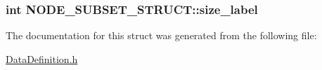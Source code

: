 \hypertarget{structNODE__SUBSET__STRUCT_ab2b2587d1db1672a8dcf6e7050b30f82}{
\subsubsection[{size\-\_\-label}]{\setlength{\rightskip}{0pt plus 5cm}int N\-O\-D\-E\-\_\-\-S\-U\-B\-S\-E\-T\-\_\-\-S\-T\-R\-U\-C\-T\-::size\-\_\-label}}\label{structNODE__SUBSET__STRUCT_ab2b2587d1db1672a8dcf6e7050b30f82}


The documentation for this struct was generated from the following file\-:\begin{DoxyCompactItemize}
\item 
\hyperlink{DataDefinition_8h}{Data\-Definition.\-h}\end{DoxyCompactItemize}
